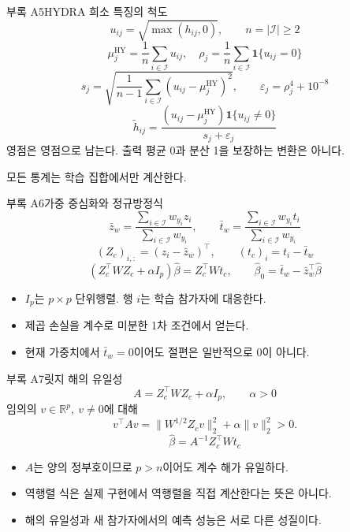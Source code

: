 \documentclass[aspectratio=169,11pt]{beamer}
\newcommand{\R}{\mathbb R}
\newcommand{\ind}{\mathbf 1}
\newcommand{\code}[1]{\texttt{\detokenize{#1}}}
\newcommand{\src}[1]{\par\vfill{\scriptsize\color{gray}#1}\par}
\DeclareMathOperator{\HY}{HY}
\begin{document}
\begin{frame}[t,label=sparse-exact]{부록 A5\quad HYDRA 희소 특징의 척도}
\small
\[
 u_{ij}=\sqrt{\max(h_{ij},0)},\qquad n=|\mathcal I|\geq2
\]
\[
 \mu_j^{\HY}=\frac1n\sum_{i\in\mathcal I}u_{ij},\quad
 \rho_j=\frac1n\sum_{i\in\mathcal I}\ind\{u_{ij}=0\}
\]
\[
 s_j=\sqrt{\frac1{n-1}\sum_{i\in\mathcal I}(u_{ij}-\mu_j^{\HY})^2},
 \qquad\varepsilon_j=\rho_j^4+10^{-8}
\]
\[
 \widetilde h_{ij}
 =\frac{(u_{ij}-\mu_j^{\HY})\ind\{u_{ij}\neq0\}}{s_j+\varepsilon_j}
\]
영점은 영점으로 남는다. 출력 평균 0과 분산 1을 보장하는 변환은 아니다.
\src{\hyperlink{ref-code}{\code{_SparseScaler}}\quad 모든 통계는 학습 집합에서만 계산한다.}
\end{frame}

\begin{frame}[t]{부록 A6\quad 가중 중심화와 정규방정식}
\small
\[
 \bar z_w=\frac{\sum_{i\in\mathcal I}w_{y_i}z_i}{\sum_{i\in\mathcal I}w_{y_i}},
 \qquad
 \bar t_w=\frac{\sum_{i\in\mathcal I}w_{y_i}t_i}{\sum_{i\in\mathcal I}w_{y_i}}
\]
\[
 (Z_c)_{i,:}=(z_i-\bar z_w)^\top,\qquad(t_c)_i=t_i-\bar t_w
\]
\[
 (Z_c^\top WZ_c+\alpha I_p)\widehat\beta=Z_c^\top Wt_c,\qquad
 \widehat\beta_0=\bar t_w-\bar z_w^\top\widehat\beta
\]
\begin{itemize}
 \item \(I_p\)는 \(p\times p\) 단위행렬. 행 \(i\)는 학습 참가자에 대응한다.
 \item 제곱 손실을 계수로 미분한 1차 조건에서 얻는다.
 \item 현재 가중치에서 \(\bar t_w=0\)이어도 절편은 일반적으로 0이 아니다.
\end{itemize}
\end{frame}

\begin{frame}[t]{부록 A7\quad 릿지 해의 유일성}
\small
\[
 A=Z_c^\top WZ_c+\alpha I_p,\qquad\alpha>0
\]
임의의 \(v\in\R^p,\ v\neq0\)에 대해
\[
 v^\top Av
 =\|W^{1/2}Z_cv\|_2^2+\alpha\|v\|_2^2>0.
\]
\[
 \widehat\beta=A^{-1}Z_c^\top Wt_c
\]
\begin{itemize}
 \item \(A\)는 양의 정부호이므로 \(p>n\)이어도 계수 해가 유일하다.
 \item 역행렬 식은 실제 구현에서 역행렬을 직접 계산한다는 뜻은 아니다.
 \item 해의 유일성과 새 참가자에서의 예측 성능은 서로 다른 성질이다.
\end{itemize}
\end{frame}
\end{document}
